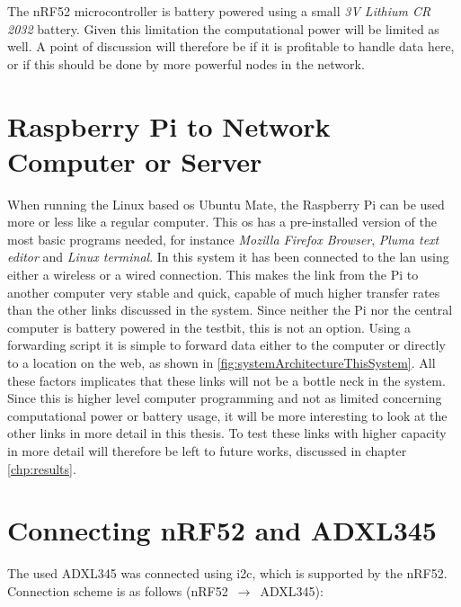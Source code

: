 \noindent The nRF52 microcontroller is battery powered using a small \textit{3V Lithium CR 2032} battery. Given this limitation the computational power will be limited as well. A point of discussion will therefore be if it is profitable to handle data here, or if this should be done by more powerful nodes in the network. 

\section{Raspberry Pi to Network Computer or Server} 

\noindent When running the Linux based \gls{os} Ubuntu Mate, the \gls{Raspberry Pi} can be used more or less like a regular computer. This \gls{os} has a pre-installed version of the most basic programs needed, for instance \textit{Mozilla Firefox Browser}, \textit{Pluma text editor} and \textit{Linux terminal}. In this system it has been connected to the \gls{lan} using either a wireless or a wired connection. This makes the link from the Pi to another computer very stable and quick, capable of much higher transfer rates than the other links discussed in the system. Since neither the Pi nor the central computer is battery powered in the testbit, this is not an option. Using a forwarding script it is simple to forward data either to the computer or directly to a location on the web, as shown in \ref{fig:systemArchitectureThisSystem}. All these factors implicates that these links will not be a bottle neck in the system. Since this is higher level computer programming and not as limited concerning computational power or battery usage, it will be more interesting to look at the other links in more detail in this thesis. To test these links with higher capacity in more detail will therefore be left to future works, discussed in chapter \ref{chp:results}. 

\newpage

\section{Connecting nRF52 and ADXL345}

\noindent The used \gls{ADXL345} was connected using \gls{i2c}, which is supported by the \gls{nRF52}. Connection scheme is as follows (\gls{nRF52} $\,\to\,$ \gls{ADXL345}): 

